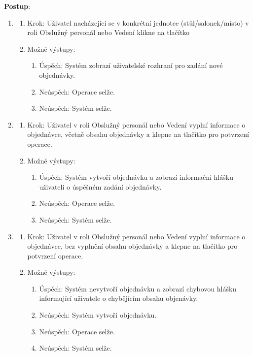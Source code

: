 \textbf{Postup}:
\begin{enumerate}
	\item 
	\begin{enumerate}
		\item Krok: Uživatel nacházející se v konkrétní jednotce (stůl/salonek/místo) v roli Obslužný personál nebo Vedení klikne na tlačítko 
		\item Možné výstupy:
		\begin{enumerate}
			\item Úspěch: Systém zobrazí uživatelské rozhraní pro zadání nové objednávky.
			\item Neúspěch: Operace selže. 
			\item Neúspěch: Systém selže. 
		\end{enumerate} 
	\end{enumerate}

	\item 
	\begin{enumerate}
		\item Krok: Uživatel v roli Obslužný personál nebo Vedení vyplní informace o objednávce, včetně obsahu objednávky a klepne na tlačítko  pro potvrzení operace.
		\item Možné výstupy:
		\begin{enumerate}
			\item Úspěch: Systém vytvoří objednávku a zobrazí informační hlášku uživateli o úspěšném zadání objednávky.
			\item Neúspěch: Operace selže.
			\item Neúspěch: Systém selže.
		\end{enumerate} 
	\end{enumerate}

	\item 
	\begin{enumerate}
		\item Krok: Uživatel v roli Obslužný personál nebo Vedení vyplní informace o objednávce, bez vyplnění obsahu objednávky a klepne na tlačítko  pro potvrzení operace.
		\item Možné výstupy:
		\begin{enumerate}
			\item Úspěch: Systém nevytvoří objednávku a zobrazí chybovou hlášku informující uživatele o chybějícím obsahu objenávky.
			\item Neúspěch: Systém vytvoří objednávku.
			\item Neúspěch: Operace selže.
			\item Neúspěch: Systém selže.
		\end{enumerate} 
	\end{enumerate}


\end{enumerate}
